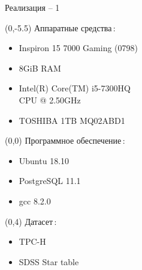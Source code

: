 \documentclass[10pt, dvipsnames]{beamer}
\begin{document}
\begin{frame}{Реализация -- 1}
	\begin{textblock}{10}(0,-5.5)
Аппаратные средства\,:
		\begin{itemize}
		\item Inspiron 15 7000 Gaming (0798)
		\item 8GiB RAM
		\item Intel(R)
Core(TM) i5-7300HQ\\ CPU @ 2.50GHz
		\item TOSHIBA 1TB MQ02ABD1
		\end{itemize}
	\end{textblock}
	
	\begin{textblock}{10}(0,0)
Программное обеспечение\,:	
		\begin{itemize}
		\item Ubuntu 18.10
		\item PostgreSQL 11.1
		\item gcc 8.2.0
		\end{itemize}
	\end{textblock}
	
	\begin{textblock}{10}(0,4)
Датасет\,:
		\begin{itemize}
		\item TPC-H
		\item SDSS Star table
		\end{itemize}
	\end{textblock}
\end{frame}
\end{document}
